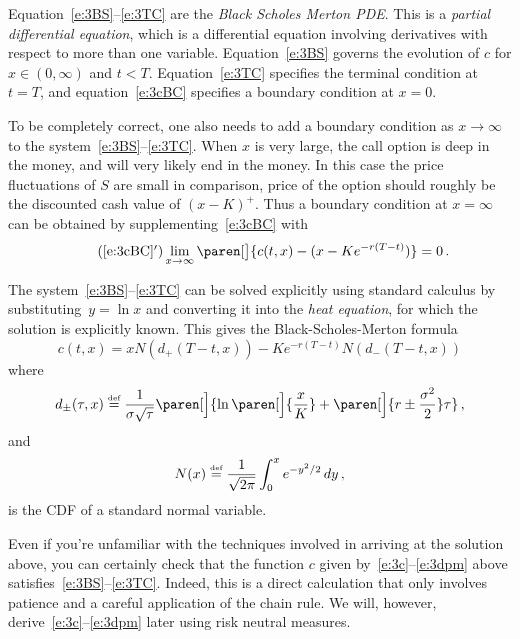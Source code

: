 \begin{remark}
  Equation~\eqref{e:3BS}--\eqref{e:3TC} are the \emph{Black Scholes Merton PDE}.
  This is a \emph{partial differential equation}, which is a differential equation involving derivatives with respect to more than one variable.
  Equation~\eqref{e:3BS} governs the evolution of $c$ for $x \in (0, \infty)$ and $t < T$.
  Equation~\eqref{e:3TC} specifies the terminal condition at $t = T$, and equation~\eqref{e:3cBC} specifies a boundary condition at $x = 0$.

  To be completely correct, one also needs to add a boundary condition as $x \to \infty$ to the system~\eqref{e:3BS}--\eqref{e:3TC}.
  When $x$ is very large, the call option is deep in the money, and will very likely end in the money.
  In this case the price fluctuations of $S$ are small in comparison, price of the option should roughly be the discounted cash value of $(x - K)^+$.
  Thus a boundary condition at $x = \infty$ can be obtained by supplementing~\eqref{e:3cBC} with
  \begin{gather}\label{e:3cBCp}
    \tag{\ref{e:3cBC}$'$}
    \lim_{x \to \infty} \paren[\big]{
      c(t, x) - (x - K e^{-r(T-t)})
    } = 0\,.
  \end{gather}
\end{remark}
\begin{remark}
  The system~\eqref{e:3BS}--\eqref{e:3TC} can be solved explicitly using standard calculus by substituting~$y = \ln x$ and converting it into the \emph{heat equation}, for which the solution is explicitly known.
  This gives the Black-Scholes-Merton formula
  \begin{equation}\label{e:3c}
    c(t, x) = x N( d_+(T - t, x) ) - Ke^{-r (T-t)} N( d_-(T-t, x) )
  \end{equation}
  where
  \begin{equation}\label{e:3dpm}
    d_\pm( \tau, x ) \defeq
      \frac{1}{\sigma \sqrt{\tau}}\paren[\Big]{
	\ln\paren[\Big]{\frac{x}{K}}
	  + \paren[\Big]{ r \pm \frac{\sigma^2}{2} } \tau
      }\,,
  \end{equation}
  and
  \begin{equation}\label{e:3N}
    N(x) \stackrel{\scriptscriptstyle\textup{def}}{=} \frac{1}{\sqrt{2\pi}} \int_0^x e^{-y^2 / 2} \, dy\,,
  \end{equation}
  is the CDF of a standard normal variable.

  Even if you're unfamiliar with the techniques involved in arriving at the solution above, you can certainly check that the function $c$ given by~\eqref{e:3c}--\eqref{e:3dpm} above satisfies~\eqref{e:3BS}--\eqref{e:3TC}.
  Indeed, this is a direct calculation that only involves patience and a careful application of the chain rule.
  We will, however, derive~\eqref{e:3c}--\eqref{e:3dpm} later using risk neutral measures.
\end{remark}



